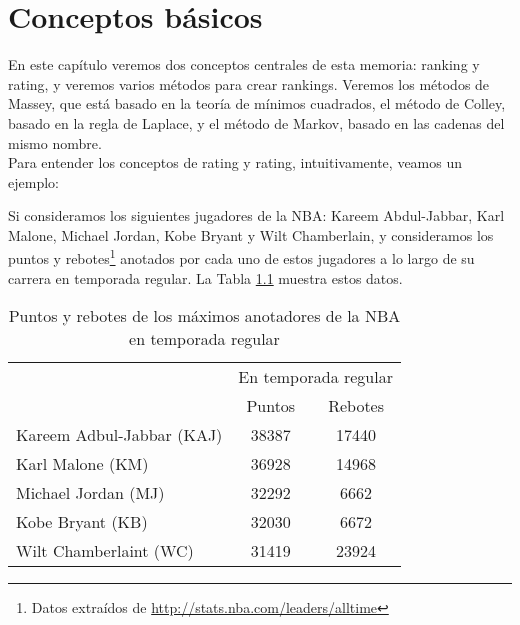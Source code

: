 \chapter{Conceptos básicos} \label{chp:conceptos_basicos}

En este capítulo veremos dos conceptos centrales de esta memoria: ranking y rating, y veremos varios métodos para crear rankings. Veremos los métodos de Massey, que está basado en la teoría de mínimos cuadrados, el método de Colley, basado en la regla de Laplace, y el método de Markov, basado en las cadenas del mismo nombre.\\

Para entender los conceptos de rating y rating, intuitivamente, veamos un ejemplo:

\begin{ejemplo}
Si consideramos los siguientes jugadores de la NBA: Kareem Abdul-Jabbar, Karl Malone, Michael Jordan, Kobe Bryant y Wilt Chamberlain, y consideramos los puntos y rebotes\footnote{Datos extraídos de \url{http://stats.nba.com/leaders/alltime}} anotados por cada uno de estos jugadores a lo largo de su carrera en temporada regular. La Tabla \ref{tbl:puntos_rebotes} muestra estos datos.

\begin{table}[h]
\centering
\caption[Puntos y rebotes de los máximos anotadores de la NBA]{Puntos y rebotes de los máximos anotadores de la NBA en temporada regular}
\label{tbl:puntos_rebotes}
\begin{tabular}{@{}lcc@{}}
\cmidrule(l){2-3}
\multicolumn{1}{c}{}      & \multicolumn{2}{c}{En temporada regular} \\ \cmidrule(l){2-3} 
\multicolumn{1}{c}{}      & Puntos             & Rebotes             \\ \midrule
Kareem Adbul-Jabbar (KAJ) & 38387              & 17440               \\ \midrule
Karl Malone (KM)          & 36928              & 14968               \\ \midrule
Michael Jordan (MJ)       & 32292              & 6662                \\ \midrule
Kobe Bryant (KB)          & 32030              & 6672                \\ \midrule
Wilt Chamberlaint (WC)    & 31419              & 23924               \\ \bottomrule
\end{tabular}
\end{table}


\end{ejemplo}
